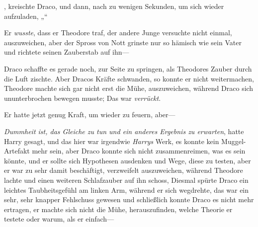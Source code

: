 \later

, kreischte Draco, und dann, nach zu wenigen Sekunden, um sich wieder aufzuladen, „“

Er \emph{wusste}, dass er Theodore traf, der andere Junge versuchte nicht einmal, auszuweichen, aber der Spross von Nott grinste nur so hämisch wie sein Vater und richtete seinen Zauberstab auf ihn—

Draco schaffte es gerade noch, zur Seite zu springen, als Theodores Zauber durch die Luft zischte. Aber Dracos Kräfte schwanden, so konnte er nicht weitermachen, Theodore machte sich gar nicht erst die Mühe, auszuweichen, während Draco sich ununterbrochen bewegen musste; Das war \emph{verrückt}.

Er hatte jetzt genug Kraft, um wieder zu feuern, aber—

\emph{Dummheit ist, das Gleiche zu tun und ein anderes Ergebnis zu erwarten}, hatte Harry gesagt, und das hier war irgendwie \emph{Harrys} Werk, es konnte kein Muggel-Artefakt mehr sein, aber Draco konnte sich nicht zusammenreimen, was es sein könnte, und er sollte sich Hypothesen ausdenken und Wege, diese zu testen, aber er war zu sehr damit beschäftigt, verzweifelt auszuweichen, während Theodore lachte und einen weiteren Schlafzauber auf ihn schoss, Diesmal spürte Draco ein leichtes Taubheitsgefühl am linken Arm, während er sich wegdrehte, das war ein sehr, sehr knapper Fehlschuss gewesen und schließlich konnte Draco es nicht mehr ertragen, er machte sich nicht die Mühe, herauszufinden, welche Theorie er testete oder warum, als er einfach—

